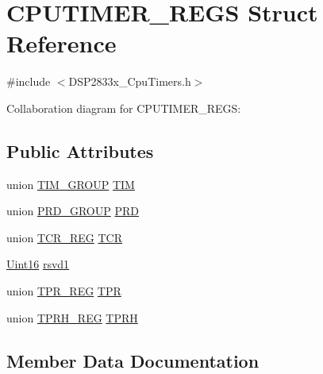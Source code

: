 \hypertarget{struct_c_p_u_t_i_m_e_r___r_e_g_s}{}\section{C\+P\+U\+T\+I\+M\+E\+R\+\_\+\+R\+E\+G\+S Struct Reference}
\label{struct_c_p_u_t_i_m_e_r___r_e_g_s}


{\ttfamily \#include $<$D\+S\+P2833x\+\_\+\+Cpu\+Timers.\+h$>$}



Collaboration diagram for C\+P\+U\+T\+I\+M\+E\+R\+\_\+\+R\+E\+G\+S\+:
\subsection*{Public Attributes}
\begin{DoxyCompactItemize}
\item 
union \hyperlink{union_t_i_m___g_r_o_u_p}{T\+I\+M\+\_\+\+G\+R\+O\+U\+P} \hyperlink{struct_c_p_u_t_i_m_e_r___r_e_g_s_a8d4f65a9351620aed13f0ba5f7fb09c5}{T\+I\+M}
\item 
union \hyperlink{union_p_r_d___g_r_o_u_p}{P\+R\+D\+\_\+\+G\+R\+O\+U\+P} \hyperlink{struct_c_p_u_t_i_m_e_r___r_e_g_s_a04613441513e7be1303e12fa9fe25d51}{P\+R\+D}
\item 
union \hyperlink{union_t_c_r___r_e_g}{T\+C\+R\+\_\+\+R\+E\+G} \hyperlink{struct_c_p_u_t_i_m_e_r___r_e_g_s_aa82e7b53b31bb314c0e9d40fc4b8d2c6}{T\+C\+R}
\item 
\hyperlink{_d_s_p2833x___device_8h_a59a9f6be4562c327cbfb4f7e8e18f08b}{Uint16} \hyperlink{struct_c_p_u_t_i_m_e_r___r_e_g_s_af7d276d7255b1e7f3d0608315ab6af8e}{rsvd1}
\item 
union \hyperlink{union_t_p_r___r_e_g}{T\+P\+R\+\_\+\+R\+E\+G} \hyperlink{struct_c_p_u_t_i_m_e_r___r_e_g_s_a82cb3c7bbf6bcc09fdafb05447f27756}{T\+P\+R}
\item 
union \hyperlink{union_t_p_r_h___r_e_g}{T\+P\+R\+H\+\_\+\+R\+E\+G} \hyperlink{struct_c_p_u_t_i_m_e_r___r_e_g_s_a8dfdba9cf05c9f01e5c8e2dcf6e9cb97}{T\+P\+R\+H}
\end{DoxyCompactItemize}


\subsection{Member Data Documentation}
\hypertarget{struct_c_p_u_t_i_m_e_r___r_e_g_s_a04613441513e7be1303e12fa9fe25d51}{}
